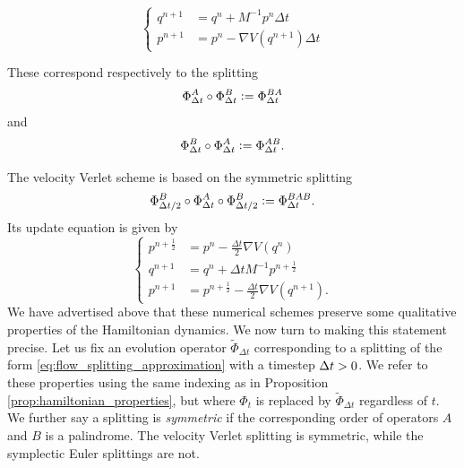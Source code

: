     \begin{equation}\label{eq:symplectic_euler_B}
        \left\{\begin{aligned}
             q^{n+1} &=q^n +M^{-1}p^n\Delta t\\
             p^{n+1} &=p^n - \nabla V(q^{n+1})\Delta t
        \end{aligned}\right.
    \end{equation}

    These correspond respectively to the splitting 
    \[\Phi_{\Delta t}^A\circ\Phi_{\Delta t}^B\mathrel{\mathop:}= \Phi_{\Delta t}^{BA}\]
    and
    \[\Phi_{\Delta t}^B\circ\Phi_{\Delta t}^A\mathrel{\mathop:}= \Phi_{\Delta t}^{AB}.\]
    
    The velocity Verlet scheme is based on the symmetric splitting
    \[\Phi_{\Delta t/2}^B\circ\Phi_{\Delta t}^A\circ\Phi_{\Delta t/2}^B\mathrel{\mathop:}= \Phi_{\Delta t}^{BAB}.\]
    Its update equation is given by
    \begin{equation}\label{eq:verlet}
        \left\{\begin{aligned}
             p^{n+\frac12} &=p^n - \frac{\Delta t}{2}\nabla V(q^n)\\
             q^{n+1} &=q^n + \Delta t M^{-1}p^{n+\frac 12}\\
             p^{n+1} &= p^{n+\frac12}-\frac{\Delta t}{2}\nabla V(q^{n+1}).
        \end{aligned}\right.
    \end{equation}
    We have advertised above that these numerical schemes preserve some qualitative properties of the Hamiltonian dynamics. We now turn to making this statement precise.
    Let us fix an evolution operator $\tilde\Phi_{\Delta t}$ corresponding to a splitting of the form \eqref{eq:flow_splitting_approximation} with a timestep ${\Delta t}>0$.
    We refer to these properties using the same indexing as in Proposition \ref{prop:hamiltonian_properties}, but where $\Phi_t$ is replaced by $\tilde\Phi_{\Delta t}$ regardless of $t$.
    We further say a splitting is \textit{symmetric} if the corresponding order of operators $A$ and $B$ is a palindrome. The velocity Verlet splitting is symmetric, while the symplectic Euler splittings are not.

